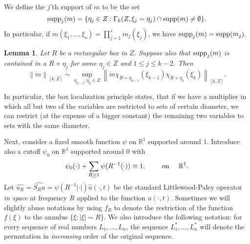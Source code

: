 \documentclass[draft,11pt,leqno]{amsart}
\newtheorem{lemma}{Lemma}
\newcommand{\q}{\quad}
\newcommand{\qq}{\quad\quad}
\newcommand{\norm}[2]{{\left\| #1 \right\|}_{#2}}
\newcommand{\Ga}{\Gamma}
\newcommand{\rone}{\mathbb R^1}
\newcommand{\suml}{\sum\limits}
\newcommand{\supl}{\sup\limits}
\begin{document}
We define the $j$'th support
of $m$ to be the set
$$
\textup{supp}_j(m)=\{\eta_j\in Z:\Ga_k(Z,\xi_j=\eta_j)\cap \textup{supp}(m)\neq\emptyset\}.
$$
In particular, if $\displaystyle m(\xi_1,\ldots, \xi_s)=\prod\limits_{j=1}^s m_j(\xi_j)$, we have
$\textup{supp}_j(m)=\textup{supp}(m_j)$.
\begin{lemma}
\label{le:2}
Let $R$ be a rectangular box in $Z$. Suppose also that $\textup{supp}_j(m)$ is contained in a $R+\eta_j$ for some
$\eta_j\in Z $ and $1\leq j\leq k-2$. Then
$$
\norm{m}{[k,Z]}\sim \supl_{\eta_{k-1},\eta_k\in Z} \norm{m\chi_{R+\eta_{k-1}}(\xi_{k-1})
\chi_{R+\eta_{k}}(\xi_k)}{[k,Z]}.
$$
\end{lemma}
In particular, the box localization principle states, that if we have a multiplier in which all
but two of the variables are restricted to  sets of certain diameter, we can restrict (at the expense
of a bigger constant) the remaining
two variables to sets with the same diameter.

Next, consider a fixed smooth function  $\psi$ on $\rone$ supported
around $1$. Introduce 
also a cutoff $\psi_0$  on $\rone$ supported around $0$ with 
$$
\psi_0(\cdot)+\suml_{R\geq 1} \psi(R^{-1}(\cdot))\equiv 1,
\qq \textup{ on } \q \rone.
$$
Let $\widehat{u_R}=\widehat{S_R u}=
\psi(R^{-1}|\cdot|)\widehat{u}(\cdot,t)$ be the standard Littlewood-Paley operator {\it in space}  
at frequency
$R$ applied to the function $u(\cdot,t)$. Sometimes we will slightly
abuse notations  by using $f_R$ to denote the restriction of the function
$f(\xi)$ to the annulus $\{\xi: |\xi|\sim R\}$.
We also   introduce  the
following notation: for every sequence of real numbers $L_1,\ldots, L_n$,
the sequence $L_1^*, \ldots, L_n^* $  will denote the permutation in
 {\it increasing} order of the original sequence.
\end{document}
